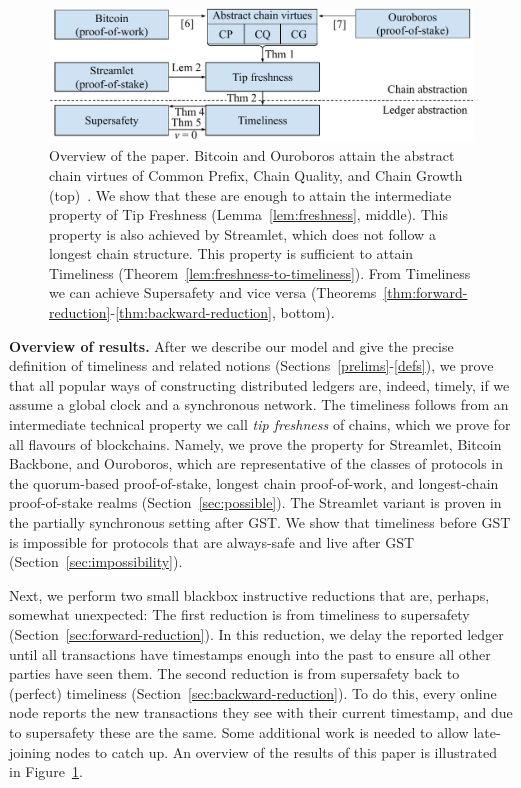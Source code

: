 \begin{figure}
  \centering
  \includegraphics[width=1.0\columnwidth,keepaspectratio]{figures/timeliness-overview.pdf}
  \caption{Overview of the paper. Bitcoin and Ouroboros attain the abstract chain virtues
  of Common Prefix, Chain Quality, and Chain Growth (top)~\cite{backbone,ouroboros}.
  We show that these are enough to attain the intermediate property of Tip Freshness
  (Lemma~\ref{lem:freshness}, middle). This property is also achieved by Streamlet, which does
  not follow a longest chain structure. This property is sufficient to attain Timeliness
  (Theorem~\ref{lem:freshness-to-timeliness}). From Timeliness we can achieve Supersafety
  and vice versa (Theorems~\ref{thm:forward-reduction}-\ref{thm:backward-reduction}, bottom).
  }
 \label{fig:overview}
\end{figure}

\noindent
\textbf{Overview of results.}
After we describe our model and give the precise definition
of timeliness and related notions (Sections~\ref{prelims}-\ref{defs}),
we prove that all popular ways of constructing distributed ledgers
are, indeed, timely, if we assume a global clock and a synchronous network.
The timeliness follows from an intermediate technical property we call \emph{tip freshness}
of chains, which we prove for all flavours of blockchains. Namely, we prove the
property for Streamlet, Bitcoin Backbone, and Ouroboros, which are representative
of the classes of protocols in the quorum-based proof-of-stake, longest chain
proof-of-work, and longest-chain proof-of-stake realms (Section~\ref{sec:possible}).
The Streamlet variant is proven in the partially synchronous setting after GST.
We show that timeliness before GST is impossible for protocols that are always-safe
and live after GST (Section~\ref{sec:impossibility}).

Next, we perform two small blackbox instructive reductions that are, perhaps, somewhat unexpected:
The first reduction is from timeliness to supersafety (Section~\ref{sec:forward-reduction}).
In this reduction, we delay the reported ledger until all
transactions have timestamps enough into the past to ensure all other parties have seen them.
The second reduction is from supersafety back to (perfect) timeliness (Section~\ref{sec:backward-reduction}).
To do this, every online node reports the new transactions they see with
their current timestamp, and due to supersafety these are the same.
Some additional work is needed to allow late-joining nodes to catch up.
An overview of the results of this paper is illustrated in Figure~\ref{fig:overview}.

